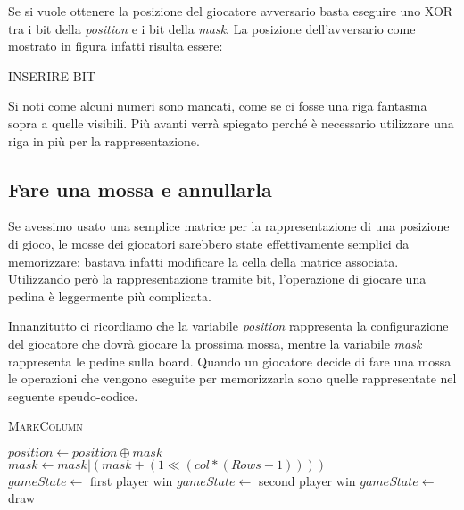 \documentclass[a4paper]{article}
\begin{document}
Se si vuole ottenere la posizione del giocatore avversario basta eseguire uno
XOR tra i bit della \emph{position} e i bit della \emph{mask}. La posizione
dell'avversario come mostrato in figura infatti risulta essere:
\begin{center}
  INSERIRE BIT
\end{center}
Si noti come alcuni numeri sono mancati, come se ci fosse una riga fantasma 
sopra a quelle visibili. Più avanti verrà spiegato perché è necessario 
utilizzare una riga in più per la rappresentazione.


\subsection{Fare una mossa e annullarla}
Se avessimo usato una semplice matrice per la rappresentazione di una posizione
di gioco, le mosse dei giocatori sarebbero state effettivamente semplici da
memorizzare: bastava infatti modificare la cella della matrice associata. 
Utilizzando però la rappresentazione tramite bit, l'operazione di giocare una
pedina è leggermente più complicata. 

Innanzitutto ci ricordiamo che la variabile \emph{position} rappresenta la 
configurazione del giocatore che dovrà giocare la prossima mossa, mentre la 
variabile \emph{mask} rappresenta le pedine sulla board. Quando un giocatore
decide di fare una mossa le operazioni che vengono eseguite per memorizzarla
sono quelle rappresentate nel seguente speudo-codice.

\begin{algorithm}
  \caption{\textsc{MarkColumn}}
  \begin{algorithmic}
      \State $position \gets position \oplus mask$
      \State $mask \gets mask | (mask + (1 \ll (col * (Rows + 1))))$
      \\
          \State $gameState \gets $ first player win
        \Else
          \State $gameState \gets $ second player win 
        \EndIf
          \State $gameState \gets $ draw
      \EndIf
    \EndFunction
  \end{algorithmic}
\end{algorithm}
\end{document}
